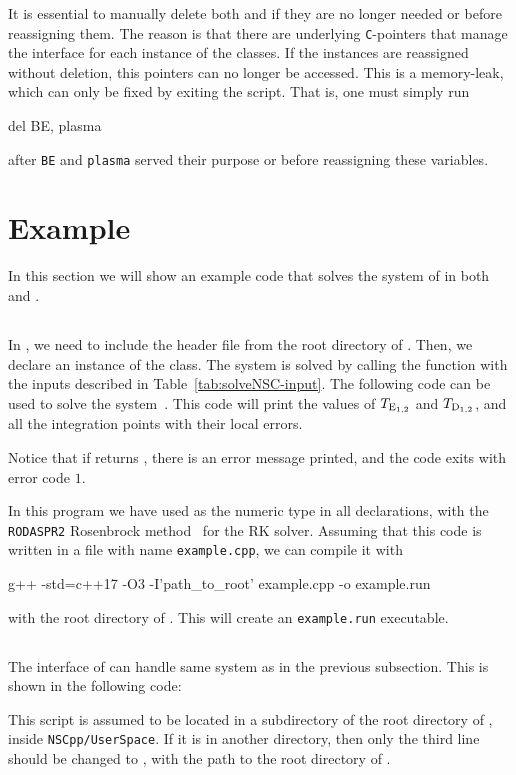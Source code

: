\documentclass[11pt,a4paper]{article}
\begin{document}
It is essential to manually delete both  and  if they are no longer needed or before reassigning them. The reason is that there are underlying {\tt C}-pointers that manage the \PY interface for each instance of the classes. If the instances are reassigned without deletion, this pointers can no longer be accessed. This is a memory-leak, which can only be fixed by exiting the script. 
%
That is, one must simply run 
%
\begin{py}
	del BE, plasma
\end{py}  
%
after {\tt BE} and {\tt plasma} served their purpose or before reassigning these variables.

\section{Example}\label{sec:example}
\setcounter{equation}{0}
%
In this section we will show an example code that solves the system of  in both \CPP and \PY.
%
\subsection{\CPP}
%
In \CPP, we need to include the header file  from the root directory of \nsc. Then, we declare an instance of the  class. The system is solved by calling the  function with the inputs described in Table~\ref{tab:solveNSC-input}. The following code can be used to solve the system~. This code will print the values of $T_{\rm E_{1,2}}$ and $T_{\rm D_{1,2}}$, and all the integration points with their local errors.
%
\lstset{language = c++}

%
Notice that if  returns , there is an error message printed, and the code exits  with error code $1$.

In this program we have used  as the numeric type in all declarations, with the {\tt RODASPR2} Rosenbrock method~\cite{RangAngermann2005} for the RK solver. Assuming that this code is written in a file with name {\tt example.cpp}, we can compile it with 
%
\begin{bash}
	g++ -std=c++17 -O3 -I'path_to_root' example.cpp -o example.run	
\end{bash}
%
with  the root directory of \nsc. This will create an {\tt example.run} executable.

\subsection{\PY}
%
The \PY interface of \nsc can handle same system as in the previous subsection. This is shown in the following code:
%
\lstset{language = python}

%
This script is assumed to be located in a subdirectory of the root directory of \nsc, \eg inside {\tt NSCpp/UserSpace}. If it is in another directory, then only the third line should be changed to , with  the path to the root directory of \nsc.
\end{document}
